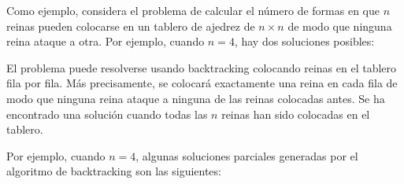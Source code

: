 
Como ejemplo, considera el problema de
calcular el número
de formas en que $n$ reinas pueden colocarse en
un tablero de ajedrez de $n \times n$ de modo que
ninguna reina ataque a otra.
Por ejemplo, cuando $n=4$,
hay dos soluciones posibles:

\begin{center}
\end{center}

El problema puede resolverse usando backtracking
colocando reinas en el tablero fila por fila.
Más precisamente, se colocará exactamente una reina
en cada fila de modo que ninguna reina ataque
a ninguna de las reinas colocadas antes.
Se ha encontrado una solución cuando todas las
$n$ reinas han sido colocadas en el tablero.

Por ejemplo, cuando $n=4$,
algunas soluciones parciales generadas por
el algoritmo de backtracking son las siguientes:

